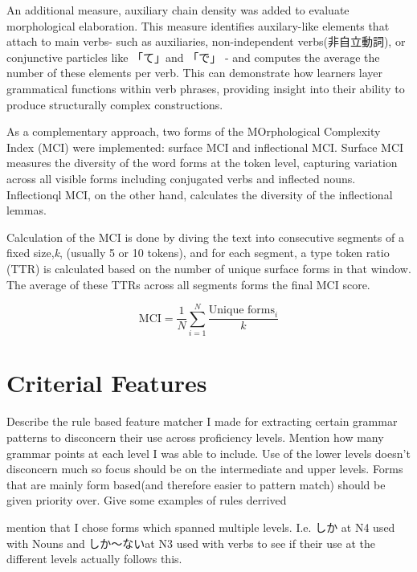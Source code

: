 An additional measure, auxiliary chain density was
added to evaluate
morphological elaboration. This measure identifies auxilary-like elements that attach to main verbs- such as
auxiliaries, non-independent verbs(非自立動詞), or conjunctive particles like 「て」and 「で」 - and computes the average the
number of these elements per verb. This can demonstrate how learners layer grammatical functions within verb
phrases, providing insight into their ability to produce structurally complex constructions.

As a complementary approach, two forms of the MOrphological Complexity Index (MCI) were implemented: surface MCI and
inflectional MCI. Surface MCI measures the diversity of the word forms at the token level, capturing variation
across all visible forms including conjugated verbs and inflected nouns. Inflectionql MCI, on the other hand,
calculates the diversity of
the inflectional lemmas.

Calculation of the MCI is done by diving the text into consecutive segments of a fixed size,\textit{k}, (usually 5
or 10
tokens), and for each segment, a type token ratio (TTR) is calculated based on the number of unique surface forms in
that window. The average of these TTRs across all segments forms the final MCI score.

\begin{equation}
    \text{MCI} = \frac{1}{N}\sum_{i=1}^{N} \frac{\text{Unique forms}_i}{k}
\end{equation}

\section{Criterial Features}

Describe the rule based feature matcher I made for extracting certain grammar patterns to disconcern their use
across proficiency levels. Mention how many grammar points at each level I was able to include. Use of the lower
levels doesn't disconcern much so focus should be on the intermediate and upper levels.  Forms that are mainly form
based(and therefore easier to pattern match) should be given priority over. Give some examples of rules derrived

mention that I chose forms which spanned multiple levels. I.e. しか at N4 used with Nouns and しか〜ないat N3 used
with verbs to see if their use at the different levels actually follows this.


